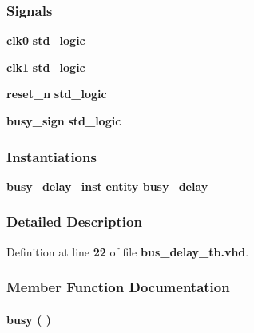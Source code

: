 \subsubsection*{Signals}
 \begin{DoxyCompactItemize}
\item 
{\bf clk0} {\bfseries \textcolor{comment}{std\+\_\+logic}\textcolor{vhdlchar}{ }} 
\item 
{\bf clk1} {\bfseries \textcolor{comment}{std\+\_\+logic}\textcolor{vhdlchar}{ }} 
\item 
{\bf reset\+\_\+n} {\bfseries \textcolor{comment}{std\+\_\+logic}\textcolor{vhdlchar}{ }} 
\item 
{\bf busy\+\_\+sign} {\bfseries \textcolor{comment}{std\+\_\+logic}\textcolor{vhdlchar}{ }} 
\end{DoxyCompactItemize}
\subsubsection*{Instantiations}
 \begin{DoxyCompactItemize}
\item 
{\bf busy\+\_\+delay\+\_\+inst}  {\bfseries entity busy\+\_\+delay}   
\end{DoxyCompactItemize}


\subsubsection{Detailed Description}


Definition at line {\bf 22} of file {\bf bus\+\_\+delay\+\_\+tb.\+vhd}.



\subsubsection{Member Function Documentation}
\paragraph[{busy}]{\setlength{\rightskip}{0pt plus 5cm} {\bfseries \textcolor{vhdlchar}{ }} busy ( ) \hspace{0.3cm}{\ttfamily [Process]}}\label{classbusy__delay__tb_1_1tb__behave_ab5707289495a33e90ac7ce232adcca4c}


